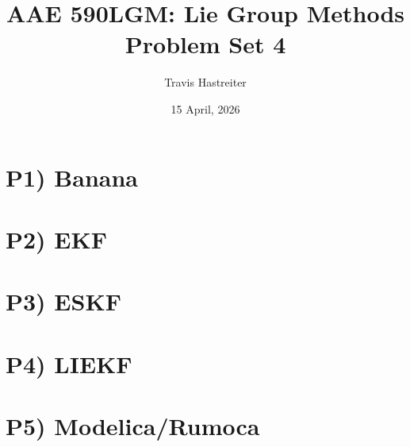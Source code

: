 \documentclass[titlepage]{article}
\title{\textbf{AAE 590LGM: Lie Group Methods} \\ Problem Set 4}
\author{Travis Hastreiter}
\date{15 April, 2026}
\numberwithin{equation}{section}
\begin{document}
\maketitle
\tableofcontents
\newpage
\lstlistoflistings
\newpage
\section{P1) Banana}

%
\clearpage

\section{P2) EKF}


\clearpage

\section{P3) ESKF}


\clearpage

\section{P4) LIEKF}


\clearpage

\section{P5) Modelica/Rumoca}


\clearpage
\end{document}
